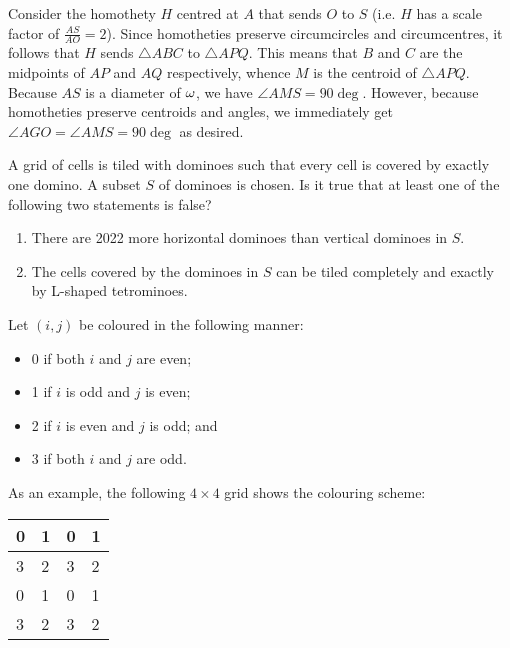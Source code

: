 Consider the homothety $H$ centred at $A$ that sends $O$ to $S$ (i.e. $H$ has a scale factor of $\frac{AS}{AO} = 2$). Since homotheties preserve circumcircles and circumcentres, it follows that $H$ sends $\triangle ABC$ to $\triangle APQ$. This means that $B$ and $C$ are the midpoints of $AP$ and $AQ$ respectively, whence $M$ is the centroid of $\triangle APQ$. Because $AS$ is a diameter of $\omega$, we have $\angle AMS = 90\deg$. However, because homotheties preserve centroids and angles, we immediately get $\angle AGO = \angle AMS = 90\deg$ as desired.

\begin{question}[Yes]\label{A::2023-O-2-2}
    A grid of cells is tiled with dominoes such that every cell is covered by exactly one domino. A subset $S$ of dominoes is chosen. Is it true that at least one of the following two statements is false?
    \begin{enumerate}
        \item There are 2022 more horizontal dominoes than vertical dominoes in $S$.
        \item The cells covered by the dominoes in $S$ can be tiled completely and exactly by L-shaped tetrominoes.
    \end{enumerate}
\end{question}


 Let $(i, j)$ be coloured in the following manner:
\begin{itemize}
    \item 0 if both $i$ and $j$ are even;
    \item 1 if $i$ is odd and $j$ is even;
    \item 2 if $i$ is even and $j$ is odd; and
    \item 3 if both $i$ and $j$ are odd.
\end{itemize}

As an example, the following $4 \times 4$ grid shows the colouring scheme:
\begin{table}[H]
    \centering
    \begin{tabular}{|l|l|l|l|}
    \hline
    0 & 1 & 0 & 1 \\ \hline
    3 & 2 & 3 & 2 \\ \hline
    0 & 1 & 0 & 1 \\ \hline
    3 & 2 & 3 & 2 \\ \hline
    \end{tabular}
\end{table}

